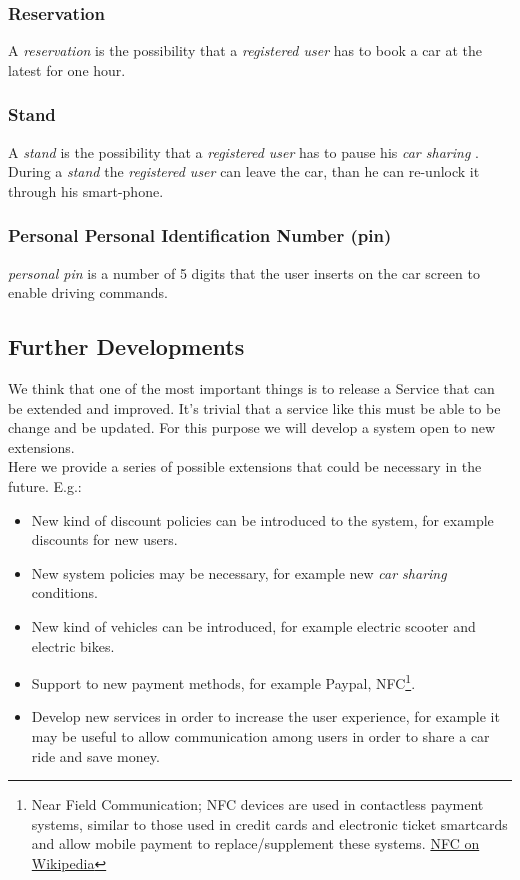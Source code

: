 \documentclass[english]{article}
\newcommand{\carsharing}{\textit {car sharing }}
\newcommand{\registereduser}{\textit {registered user }}
\newcommand{\resevation}{\textit{reservation }}
\newcommand{\stand}{\textit{stand }}
\newcommand{\personalpin}{\textit{personal pin }}
\begin{document}
	\subsubsection{Reservation}
		A \resevation is the possibility that a \registereduser has to book a car at the latest for one hour.
	\subsubsection{Stand}
		A \stand is the possibility that a \registereduser has to pause his \carsharing. During a \stand the \registereduser can leave the car, than he can re-unlock it through his smart-phone.
	\subsubsection{Personal  Personal Identification Number (pin)}
		 \personalpin is a number of 5 digits that the user inserts on the car screen to enable driving commands.

\subsection{Further Developments}
	We think that one of the most important things is to release a Service that can be extended and improved. It's trivial that a service like this must be able to be change and be updated.
	For this purpose we will develop a system open to new extensions. \\
	Here we provide a series of possible extensions that could be necessary in the future.
	E.g.:
	\begin{itemize}
		\item New kind of discount policies can be introduced to the system, for example discounts for new users. 
		\item New system policies may be necessary, for example new \carsharing conditions.
		\item New kind of vehicles can be introduced, for example electric scooter and electric bikes.
		\item Support to new payment methods, for example Paypal\textregistered, NFC\footnote{Near Field Communication; NFC devices are used in contactless payment systems, similar to those used in credit cards and electronic ticket smartcards and allow mobile payment to replace/supplement these systems. \href{https://en.wikipedia.org/wiki/Near_field_communication}{NFC on Wikipedia}}.
		\item Develop new services in order to increase the user experience, for example it may be useful to allow communication among users in order to share a car ride and save money.
	\end{itemize}
\end{document}
